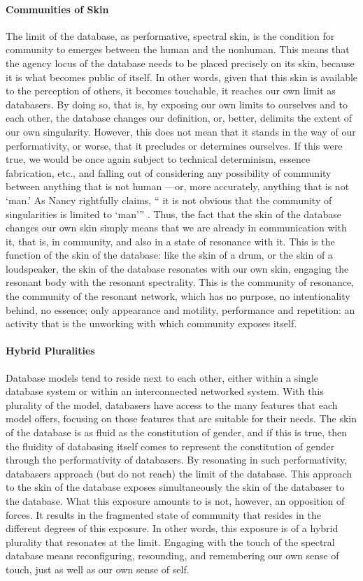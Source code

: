 \paragraph{Communities of Skin}
The limit of the database, as performative, spectral skin, is the condition for community to emerges between the human and the nonhuman. This means that the agency locus of the database needs to be placed precisely on its skin, because it is what becomes public of itself. In other words, given that this skin is available to the perception of others, it becomes touchable, it reaches our own limit as databasers. By doing so, that is, by exposing our own limits to ourselves and to each other, the database changes our definition, or, better, delimits the extent of our own singularity. However, this does not mean that it stands in the way of our performativity, or worse, that it precludes or determines ourselves. If this were true, we would be once again subject to technical determinism, essence fabrication, etc., and falling out of considering any possibility of community between anything that is not human ---or, more accurately, anything that is not `man.' As Nancy rightfully claims, `` it is not obvious that the community of singularities is limited to `man''' \cite[28]{Nan91:The}. Thus, the fact that the skin of the database changes our own skin simply means that we are already in communication with it, that is, in community, and also in a state of resonance with it. This is the function of the skin of the database: like the skin of a drum, or the skin of a loudspeaker, the skin of the database resonates with our own skin, engaging the resonant body with the resonant spectrality. This is the community of resonance, the community of the resonant network, which has no purpose, no intentionality behind, no essence; only appearance and motility, performance and repetition: an activity that is the unworking with which community exposes itself. 

\paragraph{Hybrid Pluralities}
Database models tend to reside next to each other, either within a single database system or within an interconnected networked system. With this plurality of the model, databasers have access to the many features that each model offers, focusing on those features that are suitable for their needs.  The skin of the database is as fluid as the constitution of gender, and if this is true, then the fluidity of databasing itself comes to represent the constitution of gender through the performativity of databasers. By resonating in such performativity, databasers approach (but do not reach) the limit of the database. This approach to the skin of the database exposes simultaneously the skin of the databaser to the database. What this exposure amounts to is not, however, an opposition of forces. It results in the fragmented state of community that resides in the different degrees of this exposure. In other words, this exposure is of a hybrid plurality that resonates at the limit. Engaging with the touch of the spectral database means reconfiguring, resounding, and remembering our own sense of touch, just as well as our own sense of self.
